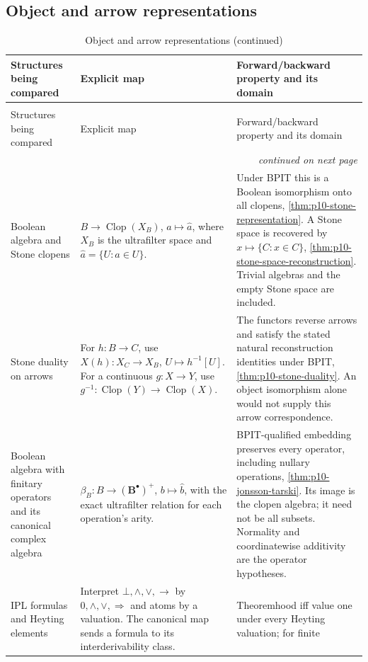 \subsection{Object and arrow representations}

\begin{longtable}{@{}p{}p{}p{}@{}}
\caption{Object and arrow representations}\\
\toprule
Structures being compared & Explicit map & Forward/backward property and its domain \\
\midrule
\endfirsthead
\caption[]{Object and arrow representations (continued)}\\
\toprule
Structures being compared & Explicit map & Forward/backward property and its domain \\
\midrule
\endhead
\midrule\multicolumn{3}{r}{\emph{continued on next page}}\\
\endfoot
\endlastfoot
Boolean algebra and Stone clopens &
\(B\to\operatorname{Clop}(X_B)\), \(a\mapsto\widehat a\), where
\(X_B\) is the ultrafilter space and \(\widehat a=\{U:a\in U\}\). &
Under BPIT this is a Boolean isomorphism onto all clopens,
\cref{thm:p10-stone-representation}. A Stone space is recovered by
\(x\mapsto\{C:x\in C\}\), \cref{thm:p10-stone-space-reconstruction}.
Trivial algebras and the empty Stone space are included. \\
Stone duality on arrows &
For \(h:B\to C\), use \(X(h):X_C\to X_B\),
\(U\mapsto h^{-1}[U]\). For a continuous \(g:X\to Y\), use
\(g^{-1}:\operatorname{Clop}(Y)\to\operatorname{Clop}(X)\). &
The functors reverse arrows and satisfy the stated natural reconstruction
identities under BPIT, \cref{thm:p10-stone-duality}. An object isomorphism
alone would not supply this arrow correspondence. \\
Boolean algebra with finitary operators and its canonical complex algebra &
\(\beta_B:B\to(\mathbf B^\bullet)^+\),
\(b\mapsto\widehat b\), with the exact ultrafilter relation for each
operation's arity. &
BPIT-qualified embedding preserves every operator, including nullary
operations, \cref{thm:p10-jonsson-tarski}. Its image is the clopen algebra;
it need not be all subsets. Normality and coordinatewise additivity are
the operator hypotheses. \\
IPL formulas and Heyting elements &
Interpret \(\bot,\land,\lor,\to\) by \(0,\wedge,\vee,\Rightarrow\)
and atoms by a valuation. The canonical map sends a formula to its
interderivability class. &
Theoremhood iff value one under every Heyting valuation; for finite

\end{longtable}
